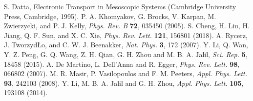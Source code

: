\documentclass[reprint,amsmath,amssymb,aps,superscriptaddress]{revtex4-2}
\begin{document}
\begin{thebibliography}{99}
S. Datta, Electronic Transport in Mesoscopic Systems (Cambridge University Press, Cambridge, 1995).
P. A. Khomyakov, G. Brocks, V. Karpan, M. Zwierzycki, and P. J. Kelly, \textit{Phys. Rev. B} {\bf 72}, 035450 (2005).
S. Cheng, H. Liu, H. Jiang, Q. F. Sun, and X. C. Xie, \textit{Phys. Rev. Lett.} {\bf 121}, 156801 (2018).
A. Rycerz, J. Tworzyd{\L}o, and C. W. J. Beenakker, \textit{Nat. Phys.} {\bf 3}, 172 (2007).
Y. Li, Q. Wan, Y. Z. Peng, G. Q. Wang, Z. H. Qian, G. H. Zhou and M. B. A. Jalil, \textit{Sci. Rep.} {\bf 5}, 18458 (2015).
A. De Martino, L. Dell'Anna and R. Egger, \textit{Phys. Rev. Lett.} {\bf 98}, 066802 (2007).
M. R. Masir, P. Vasilopoulos and F. M. Peeters, \textit{Appl. Phys. Lett.} {\bf 93}, 242103 (2008).
Y. Li, M. B. A. Jalil and G. H. Zhou, \textit{Appl. Phys. Lett.} {\bf 105}, 193108 (2014).
\end{thebibliography}	
\end{document}
